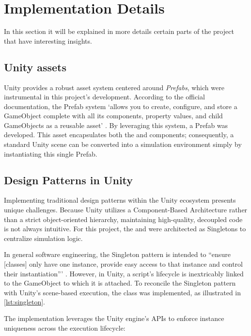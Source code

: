 \section{Implementation Details}

In this section it will be explained in more details certain parts of the project that have interesting insights.

\subsection{Unity assets}

Unity provides a robust asset system centered around \textit{Prefabs}, which were instrumental in this project’s development. According to the official documentation, the Prefab system `allows you to create, configure, and store a GameObject complete with all its components, property values, and child GameObjects as a reusable asset' \cite{unity_prefabs_6000}. By leveraging this system, a  Prefab was developed. This asset encapsulates both the  and  components; consequently, a standard Unity scene can be converted into a simulation environment simply by instantiating this single Prefab.

\subsection{Design Patterns in Unity}

Implementing traditional design patterns within the Unity ecosystem presents unique challenges. Because Unity utilizes a Component-Based Architecture rather than a strict object-oriented hierarchy, maintaining high-quality, decoupled code is not always intuitive. For this project, the  and  were architected as Singletons to centralize simulation logic.

In general software engineering, the Singleton pattern is intended to ``ensure [classes] only have one instance, provide easy access to that instance and control their instantiation''' \cite{wiki_singleton_pattern}. However, in Unity, a script's lifecycle is inextricably linked to the GameObject to which it is attached. To reconcile the Singleton pattern with Unity’s scene-based execution, the  class was implemented, as illustrated in \cref{lst:singleton}.

The implementation leverages the Unity engine's \acp{API} to enforce instance uniqueness across the execution lifecycle:

